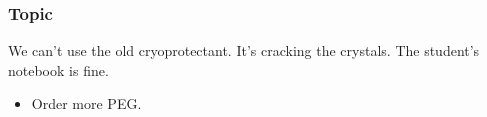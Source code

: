 \subsubsection{Topic}

We can't use the old cryoprotectant.
It's cracking the crystals.
The student's notebook is fine.

\begin{itemize}[label=\unchecked]
\item Order more PEG.
\end{itemize}
